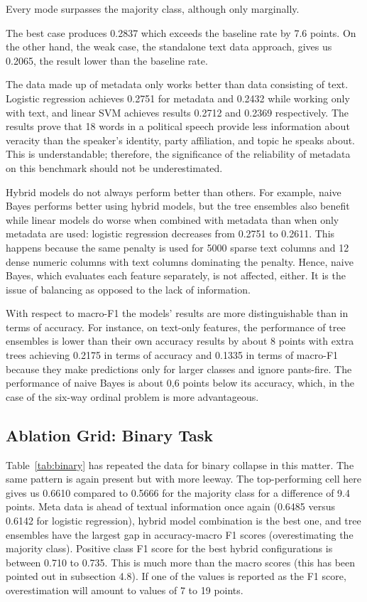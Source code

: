 \documentclass[10pt,twocolumn,twoside,a4paper]{article}
\begin{document}
Every mode surpasses the majority class, although only marginally.

The best case produces 0.2837 which exceeds the baseline rate by 7.6 points. On the other hand, the weak case, the standalone text data approach, gives us 0.2065, the result lower than the baseline rate.

The data made up of metadata only works better than data consisting of text. Logistic regression achieves 0.2751 for metadata and 0.2432 while working only with text, and linear SVM achieves results 0.2712 and 0.2369 respectively. The results prove that 18 words in a political speech provide less information about veracity than the speaker's identity, party affiliation, and topic he speaks about. This is understandable; therefore, the significance of the reliability of metadata on this benchmark should not be underestimated.

Hybrid models do not always perform better than others. For example, naive Bayes performs better using hybrid models, but the tree ensembles also benefit while linear models do worse when combined with metadata than when only metadata are used: logistic regression decreases from 0.2751 to 0.2611. This happens because the same penalty is used for 5000 sparse text columns and 12 dense numeric columns with text columns dominating the penalty. Hence, naive Bayes, which evaluates each feature separately, is not affected, either. It is the issue of balancing as opposed to the lack of information.

With respect to macro-F1 the models' results are more distinguishable than in terms of accuracy. For instance, on text-only features, the performance of tree ensembles is lower than their own accuracy results by about 8 points with extra trees achieving 0.2175 in terms of accuracy and 0.1335 in terms of macro-F1 because they make predictions only for larger classes and ignore pants-fire. The performance of naive Bayes is about 0,6 points below its accuracy, which, in the case of the six-way ordinal problem is more advantageous.

\subsection{Ablation Grid: Binary Task}

Table~\ref{tab:binary} has repeated the data for binary collapse in this matter. The same pattern is again present but with more leeway. The top-performing cell here gives us 0.6610 compared to 0.5666 for the majority class for a difference of 9.4 points. Meta data is ahead of textual information once again (0.6485 versus 0.6142 for logistic regression), hybrid model combination is the best one, and tree ensembles have the largest gap in accuracy-macro F1 scores (overestimating the majority class). Positive class F1 score for the best hybrid configurations is between 0.710 to 0.735. This is much more than the macro scores (this has been pointed out in subsection 4.8). If one of the values is reported as the F1 score, overestimation will amount to values of 7 to 19 points.
\end{document}
